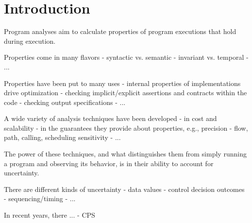 \section{Introduction}
\label{sec:introduction}

Program analyses aim to calculate properties of program executions 
that hold during execution.

Properties come in many flavors 
 - syntactic vs. semantic 
 - invariant vs. temporal
 - ...  

Properties have been put to many uses 
 - internal properties of implementations drive optimization 
 - checking implicit/explicit assertions and contracts within the code
 - checking output specifications
 - ...

A wide variety of analysis techniques have been developed
 - in cost and scalability
 - in the guarantees they provide about properties, e.g., precision
 - flow, path, calling, scheduling sensitivity
 - ...

The power of these techniques, and what distinguishes them from
simply running a program and observing its behavior, is in their
ability to account for uncertainty.
 
There are different kinds of uncertainty
 - data values
 - control decision outcomes
 - sequencing/timing
 - ...

In recent years, there ... 
 - CPS
